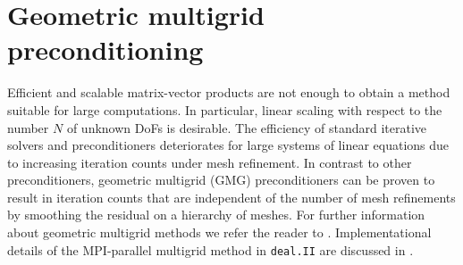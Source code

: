 \documentclass[times,doublespace]{nmeauth}
\begin{document}
\section{Geometric multigrid preconditioning}
\label{sec:gmg}

Efficient and scalable matrix-vector products are not enough to obtain a method suitable for large computations. In particular, linear scaling with respect to the number $N$ of unknown DoFs is desirable.
The efficiency of standard iterative solvers and preconditioners deteriorates for large systems of linear equations due to increasing iteration counts under mesh refinement.
In contrast to other preconditioners, geometric multigrid (GMG) preconditioners \cite{Bramble1990, Briggs2000, Janssen2011,May2015} can be proven to result in iteration counts that are independent of the number of mesh refinements by smoothing the residual on a hierarchy of meshes. For further information about geometric multigrid methods we refer the reader to \cite{Briggs2000,Hackbusch1985,Wesseling1992}.
Implementational details of the MPI-parallel multigrid method in \texttt{deal.II} are discussed in \cite{Clevenger2018}.
\end{document}
